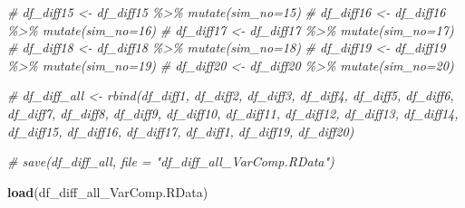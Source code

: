 \documentclass[
]{article}
\newenvironment{Shaded}{\begin{snugshade}}{\end{snugshade}}
\newcommand{\CommentTok}[1]{\textcolor[rgb]{0.56,0.35,0.01}{\textit{#1}}}
\newcommand{\FunctionTok}[1]{\textcolor[rgb]{0.13,0.29,0.53}{\textbf{#1}}}
\newcommand{\NormalTok}[1]{#1}
\newcommand{\StringTok}[1]{\textcolor[rgb]{0.31,0.60,0.02}{#1}}
\begin{document}
\begin{Shaded}
\begin{Highlighting}[]
\CommentTok{\# df\_diff15 \textless{}{-} df\_diff15 \%\textgreater{}\% mutate(sim\_no=\textquotesingle{}15\textquotesingle{})}
\CommentTok{\# df\_diff16 \textless{}{-} df\_diff16 \%\textgreater{}\% mutate(sim\_no=\textquotesingle{}16\textquotesingle{})}
\CommentTok{\# df\_diff17 \textless{}{-} df\_diff17 \%\textgreater{}\% mutate(sim\_no=\textquotesingle{}17\textquotesingle{})}
\CommentTok{\# df\_diff18 \textless{}{-} df\_diff18 \%\textgreater{}\% mutate(sim\_no=\textquotesingle{}18\textquotesingle{})}
\CommentTok{\# df\_diff19 \textless{}{-} df\_diff19 \%\textgreater{}\% mutate(sim\_no=\textquotesingle{}19\textquotesingle{})}
\CommentTok{\# df\_diff20 \textless{}{-} df\_diff20 \%\textgreater{}\% mutate(sim\_no=\textquotesingle{}20\textquotesingle{})}
\end{Highlighting}
\end{Shaded}

\begin{Shaded}
\begin{Highlighting}[]
\CommentTok{\# df\_diff\_all \textless{}{-} rbind(df\_diff1, df\_diff2, df\_diff3, df\_diff4, df\_diff5, df\_diff6, df\_diff7, df\_diff8, df\_diff9, df\_diff10, df\_diff11, df\_diff12, df\_diff13, df\_diff14, df\_diff15, df\_diff16, df\_diff17, df\_diff1, df\_diff19, df\_diff20)}
\end{Highlighting}
\end{Shaded}

\begin{Shaded}
\begin{Highlighting}[]
\CommentTok{\# save(df\_diff\_all, file = "df\_diff\_all\_VarComp.RData")}
\end{Highlighting}
\end{Shaded}

\begin{Shaded}
\begin{Highlighting}[]
\FunctionTok{load}\NormalTok{(}\StringTok{\textquotesingle{}df\_diff\_all\_VarComp.RData\textquotesingle{}}\NormalTok{)}
\end{Highlighting}
\end{Shaded}
\end{document}
